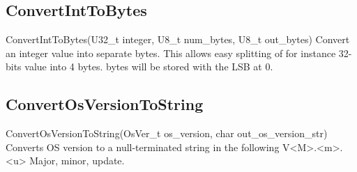 \subsection{ConvertIntToBytes}
\label{func:ConvertIntToBytes}
\begin{pdfunction}
{ConvertIntToBytes(U32\_t integer, U8\_t num\_bytes,  U8\_t out\_bytes) }
{ 
Convert an integer value into separate bytes. This allows 
easy splitting of for instance 32-bits value into 4 bytes. 
bytes will be stored with the LSB at 0. }
\end{pdfunction}

\subsection{ConvertOsVersionToString}
\label{func:ConvertOsVersionToString}
\begin{pdfunction}
{ConvertOsVersionToString(OsVer\_t os\_version,  char out\_os\_version\_str) }
{ 
Converts OS version to a null-terminated string in the following 
V<M>.<m>.<u> Major, minor, update. }
\end{pdfunction}
